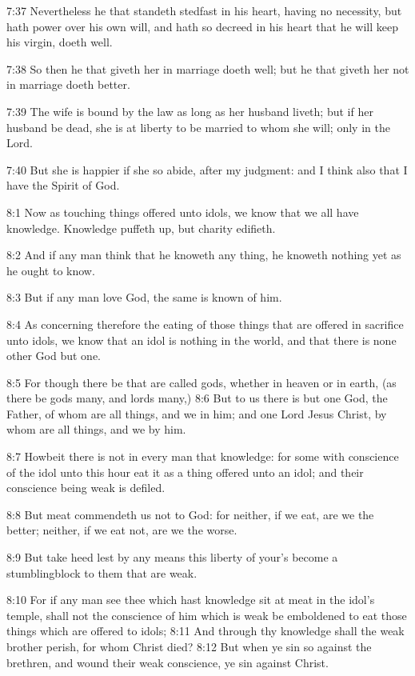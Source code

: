 7:37 Nevertheless he that standeth stedfast in his heart, having no
necessity, but hath power over his own will, and hath so decreed in
his heart that he will keep his virgin, doeth well.

7:38 So then he that giveth her in marriage doeth well; but he that
giveth her not in marriage doeth better.

7:39 The wife is bound by the law as long as her husband liveth; but
if her husband be dead, she is at liberty to be married to whom she
will; only in the Lord.

7:40 But she is happier if she so abide, after my judgment: and I
think also that I have the Spirit of God.

8:1 Now as touching things offered unto idols, we know that we all
have knowledge. Knowledge puffeth up, but charity edifieth.

8:2 And if any man think that he knoweth any thing, he knoweth nothing
yet as he ought to know.

8:3 But if any man love God, the same is known of him.

8:4 As concerning therefore the eating of those things that are
offered in sacrifice unto idols, we know that an idol is nothing in
the world, and that there is none other God but one.

8:5 For though there be that are called gods, whether in heaven or in
earth, (as there be gods many, and lords many,) 8:6 But to us there is
but one God, the Father, of whom are all things, and we in him; and
one Lord Jesus Christ, by whom are all things, and we by him.

8:7 Howbeit there is not in every man that knowledge: for some with
conscience of the idol unto this hour eat it as a thing offered unto
an idol; and their conscience being weak is defiled.

8:8 But meat commendeth us not to God: for neither, if we eat, are we
the better; neither, if we eat not, are we the worse.

8:9 But take heed lest by any means this liberty of your's become a
stumblingblock to them that are weak.

8:10 For if any man see thee which hast knowledge sit at meat in the
idol's temple, shall not the conscience of him which is weak be
emboldened to eat those things which are offered to idols; 8:11 And
through thy knowledge shall the weak brother perish, for whom Christ
died?  8:12 But when ye sin so against the brethren, and wound their
weak conscience, ye sin against Christ.

